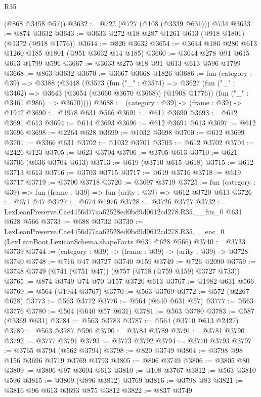 \begin{lexlean}{R35}
\begin{coremodule}
      (@868 @3458 @57))
@3632 := @722 (@727 (@108 (@3339 @631))) @734
@3633 := @874 @3632
@3643 := @3633 @272 @18 @287 @1261 @613 (@918 @1801) (@1372 (@918 @1776))
@3644 := @820 @3632
@3654 := @3644 @186 @280 @613 @1260 @185 @1801 (@951 @3632 @14 @185)
@3660 := @3644 @278 @91 @615 @613 @1799 @596
@3667 := @3633 @275 @18 @91 @613 @613 @596 @1799
@3668 := @863 @3632
@3670 := @3667 @3668 @1826
@3686 := fun (category : @39) =>
  @3388
    (@3448
      (@3573
        (fun ("_" : @3574) =>
        @3627
          (fun ("_" : @3462) => @3643 (@3654 (@3660 @3670 @3668)) (@1908 @1776))
          (fun ("_" : @3461 @986) => @3670))))
@3688 := (category : @39) -> (frame : @39) -> @1942
@3690 := @1978 @631 @566
@3691 := @617 @3690
@3693 := @612 @3691 @613
@3694 := @614 @3693
@3696 := @612 @3694 @613
@3697 := @612 @3696
@3698 := @2264 @628
@3699 := @1032 @3698
@3700 := @612 @3699
@3701 := @3366 @631
@3702 := @1032 @3701
@3703 := @612 @3702
@3704 := @2426 @123
@3705 := @623 @3704
@3706 := @3705 @613
@3710 := @621 @3706 (@636 @3704 @613)
@3713 := @619 (@3710 @615 @618)
@3715 := @612 @3713 @613
@3716 := @3703 @3715
@3717 := @619 @3716
@3718 := @619 @3717
@3719 := @3700 @3718
@3720 := @3697 @3719
@3725 := fun (category : @39) => fun (frame : @39) => fun (arity : @39) => @612 @3720 @613
@3726 := @671 @47
@3727 := @674 @1976
@3728 := @3726 @3727
@3732 := LexLeanPreserve.Cae4456d77aa62528ed0bd9d0612cd278.R35.__fits_0 @631 @628 @566
@3733 := @688 @3732
@3739 := LexLeanPreserve.Cae4456d77aa62528ed0bd9d0612cd278.R35.__enc_0
    (LexLeanBoot.LexiconSchema.shapeFacts @631 @628 @566)
@3740 := @3733 @3739
@3744 := (category : @39) -> (frame : @39) -> (arity : @39) -> @3728 @3740
@3748 := @716 @47 @3727 @3740 @159
@3749 := @726 @2090
@3759 := @3748 @3749 (@741 (@751 @47)) (@757 (@758 (@759 @159) @3727 @733))
@3765 := @874 @3749 @74 @70 @157 @3720 @613
@3767 := @1982 @631 @566
@3769 := @564 (@1944 @3767)
@3770 := @563 @3769
@3772 := @572 (@2267 @628)
@3773 := @563 @3772
@3776 := @564 (@640 @631 @57)
@3777 := @563 @3776
@3780 := @564 (@640 @57 @631)
@3781 := @563 @3780
@3783 := @587 (@3369 @631)
@3784 := @563 @3783
@3787 := @564 (@3710 @613 @2427)
@3789 := @563 @3787 @596
@3790 := @3784 @3789
@3791 := @3781 @3790
@3792 := @3777 @3791
@3793 := @3773 @3792
@3794 := @3770 @3793
@3797 := @3765 @3794 (@562 @3794)
@3798 := @820 @3749
@3804 := @3798 @98 @156 @3696 @3719 @3769 @3793
@3805 := @806 @3749
@3806 := @3805 @80
@3809 := @3806 @97 @3694 @613
@3810 := @108 @3767
@3812 := @563 @3810 @596
@3815 := @3809 (@896 @3812) @3769
@3816 := @3798 @83
@3821 := @3816 @96 @613 @3693 @875 @3812
@3822 := @837 @3749

\end{coremodule}
\end{lexlean}
